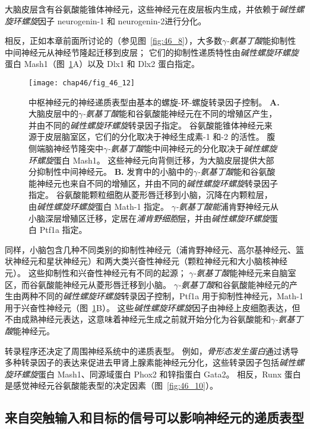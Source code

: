 大脑皮层含有谷氨酸能锥体神经元，这些神经元在皮层板内生成，并依赖于\textit{碱性螺旋环螺旋}因子 neurogenin-1 和 neurogenin-2进行分化。

相反，正如本章前面所讨论的（参见图~\ref{fig:46_8}），大多数\textit{$\gamma$-氨基丁酸}能抑制性中间神经元从神经节隆起迁移到皮层；
它们的抑制性递质特性由\textit{碱性螺旋环螺旋}蛋白 Mash1（图~\ref{fig:46_12}A）以及 Dlx1 和 Dlx2 蛋白指定。


\begin{figure}[htbp]
	\centering
	\texttt{[image: chap46/fig\_46\_12]}
	\caption{中枢神经元的神经递质表型由基本的螺旋-环-螺旋转录因子控制。
		\textbf{A.} 大脑皮层中的\textit{$\gamma$-氨基丁酸}能和谷氨酸能神经元在不同的增殖区产生，并由不同的\textit{碱性螺旋环螺旋}转录因子指定。
		谷氨酸能锥体神经元来源于皮层脑室区，它们的分化取决于神经生成素-1 和-2 的活性。
		腹侧端脑神经节隆突中\textit{$\gamma$-氨基丁酸}能中间神经元的分化取决于\textit{碱性螺旋环螺旋}蛋白 Mash1。
		这些神经元向背侧迁移，为大脑皮层提供大部分抑制性中间神经元。
		\textbf{B.} 发育中的小脑中的\textit{$\gamma$-氨基丁酸}能和谷氨酸能神经元也来自不同的增殖区，并由不同的\textit{碱性螺旋环螺旋}转录因子指定。
		谷氨酸能颗粒细胞从菱形唇迁移到小脑，沉降在内颗粒层，由\textit{碱性螺旋环螺旋}蛋白 Math-1 指定。
		\textit{$\gamma$-氨基丁酸能}浦肯野神经元从小脑深层增殖区迁移，定居在\textit{浦肯野细胞}层，并由\textit{碱性螺旋环螺旋}蛋白 Ptf1a 指定。}
	\label{fig:46_12}
\end{figure}


同样，小脑包含几种不同类别的抑制性神经元（浦肯野神经元、高尔基神经元、篮状神经元和星状神经元）和两大类兴奋性神经元（颗粒神经元和大小脑核神经元）。
这些抑制性和兴奋性神经元有不同的起源；
\textit{$\gamma$-氨基丁酸}能神经元来自脑室区，而谷氨酸能神经元从菱形唇迁移到小脑。
\textit{$\gamma$-氨基丁酸}和谷氨酸能神经元的产生由两种不同的\textit{碱性螺旋环螺旋}转录因子控制，Ptf1a 用于抑制性神经元，Math-1 用于兴奋性神经元（图~\ref{fig:46_12}B）。
这些\textit{碱性螺旋环螺旋}因子由神经上皮细胞表达，但不由成熟神经元表达，这意味着神经元生成之前就开始分化为谷氨酸能和\textit{$\gamma$-氨基丁酸}能神经元。


转录程序还决定了周围神经系统中的递质表型。
例如，\textit{骨形态发生蛋白}通过诱导多种转录因子的表达来促进去甲肾上腺素能神经元分化，这些转录因子包括\textit{碱性螺旋环螺旋}蛋白 Mash1、同源域蛋白 Phox2 和锌指蛋白 Gata2。
相反，Runx 蛋白是感觉神经元谷氨酸能表型的决定因素（图~\ref{fig:46_10}）。



\subsection{来自突触输入和目标的信号可以影响神经元的递质表型}

